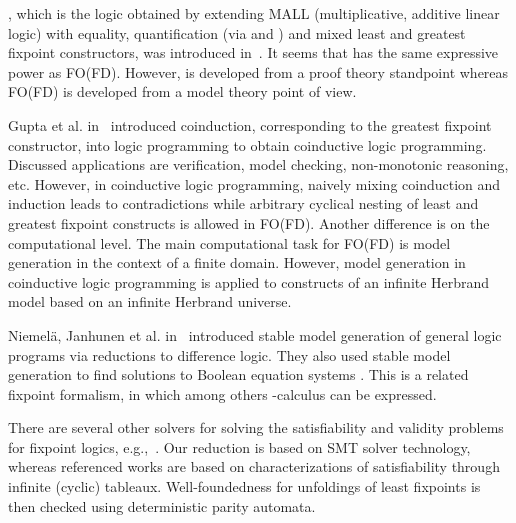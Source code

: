 \documentclass{tlp}
\begin{document}
, which is the logic obtained by extending MALL (multiplicative, additive linear logic) with equality, quantification (via  and ) and mixed least and greatest fixpoint constructors, was introduced in~\cite{lpar/BaeldeM07}. It seems that  has the same expressive power as FO(FD). However,  is developed from a proof theory standpoint whereas FO(FD) is developed from a model theory point of view.

Gupta et al. in~\cite{iclp/GuptaBMSM07} introduced coinduction, corresponding to the greatest fixpoint constructor, into logic programming to obtain coinductive logic programming. Discussed applications are  verification, model checking, non-monotonic reasoning, etc. However, in coinductive logic programming, naively mixing coinduction and induction leads to contradictions while arbitrary cyclical nesting of least and greatest fixpoint constructs is allowed in FO(FD). Another difference is on the computational level. The main computational task for FO(FD) is model generation in the context of a finite domain. However, model generation in coinductive logic programming is applied to constructs of an infinite Herbrand model based on an infinite Herbrand universe.

Niemel{\"a}, Janhunen et al. in~\cite{lpnmr/JanhunenNS09,amai/Niemela08} introduced stable model generation of general logic programs via reductions to difference logic. They also used stable model generation to find solutions to Boolean equation systems \cite{wlp/KeinanenN04}. This is a related fixpoint formalism, in which among others -calculus can be expressed.

There are several other solvers for solving the satisfiability and validity problems for fixpoint logics, e.g.,~\cite{atva/FriedmannL09}. Our reduction is based on SMT solver technology, whereas referenced works are based on characterizations of satisfiability through infinite (cyclic) tableaux. Well-foundedness for unfoldings of least fixpoints is then checked using deterministic parity automata.




\clearpage
\end{document}

